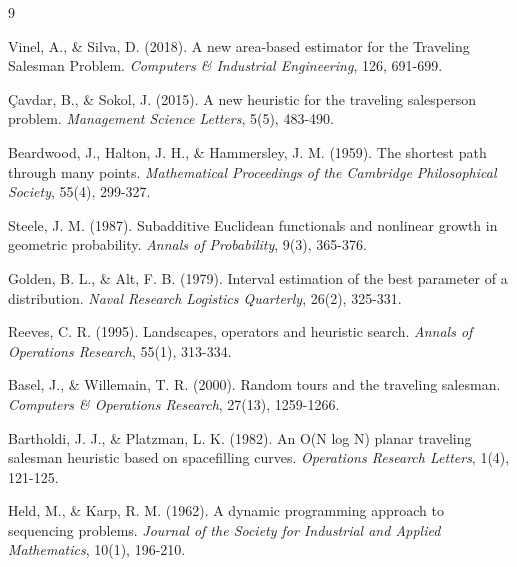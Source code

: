 \documentclass{article}
\begin{document}
\newpage
\begin{thebibliography}{9}

Vinel, A., \& Silva, D. (2018). 
A new area-based estimator for the Traveling Salesman Problem. 
\textit{Computers \& Industrial Engineering}, 126, 691-699.

Çavdar, B., \& Sokol, J. (2015). 
A new heuristic for the traveling salesperson problem. 
\textit{Management Science Letters}, 5(5), 483-490.

Beardwood, J., Halton, J. H., \& Hammersley, J. M. (1959). 
The shortest path through many points. 
\textit{Mathematical Proceedings of the Cambridge Philosophical Society}, 55(4), 299-327.

Steele, J. M. (1987). 
Subadditive Euclidean functionals and nonlinear growth in geometric probability. 
\textit{Annals of Probability}, 9(3), 365-376.

Golden, B. L., \& Alt, F. B. (1979). 
Interval estimation of the best parameter of a distribution. 
\textit{Naval Research Logistics Quarterly}, 26(2), 325-331.

Reeves, C. R. (1995). 
Landscapes, operators and heuristic search. 
\textit{Annals of Operations Research}, 55(1), 313-334.

Basel, J., \& Willemain, T. R. (2000). 
Random tours and the traveling salesman. 
\textit{Computers \& Operations Research}, 27(13), 1259-1266.

Bartholdi, J. J., \& Platzman, L. K. (1982). 
An O(N log N) planar traveling salesman heuristic based on spacefilling curves. 
\textit{Operations Research Letters}, 1(4), 121-125.

Held, M., \& Karp, R. M. (1962). 
A dynamic programming approach to sequencing problems. 
\textit{Journal of the Society for Industrial and Applied Mathematics}, 10(1), 196-210.

\end{thebibliography}
\end{document}
